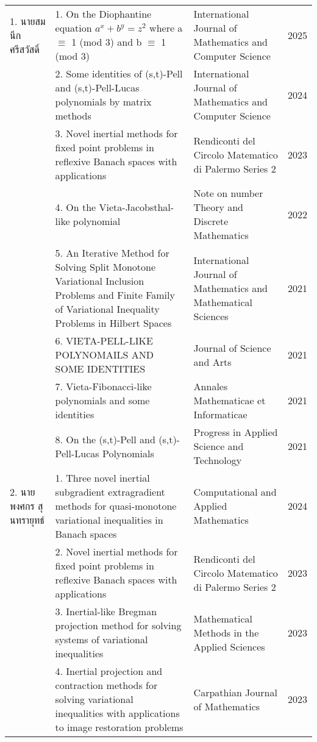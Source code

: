 {{\begin{center}
\begin{longtable}{|p{}|>{\raggedright}p{}|>{\raggedright}p{}|p{}|}
1. นายสมนึก ศรีสวัสดิ์&
1. On the Diophantine equation $a^x +b^y = z^2$
where a $\equiv$ 1 (mod 3) and b $\equiv$ 1 (mod 3) &
International Journal of Mathematics and Computer Science&
2025 
\\ \cline{2-4}
&2. Some identities of (s,t)-Pell and (s,t)-Pell-Lucas polynomials by matrix methods &
International Journal of Mathematics and Computer Science&
2024 
\\ \cline{2-4}
&3. Novel inertial methods for fixed point problems in reflexive Banach spaces with applications &
Rendiconti del Circolo Matematico di Palermo Series 2&
2023 
\\ \cline{2-4}
&4. On the Vieta-Jacobsthal-like polynomial &
Note on number Theory and Discrete Mathematics &
2022 \\ \cline{2-4}

&5. An Iterative Method for Solving Split Monotone   Variational Inclusion Problems and Finite Family of Variational Inequality Problems in Hilbert Spaces&
International Journal of Mathematics and Mathematical Sciences&2021 
\\ \cline{2-4}

&6. VIETA-PELL-LIKE \newline POLYNOMAILS AND \newline SOME IDENTITIES &
Journal of Science and Arts & 2021 
\\ \cline{2-4}

&7. Vieta-Fibonacci-like polynomials and some identities &
Annales Mathematicae et Informaticae &2021 
\\ \cline{2-4}

&8. On the (s,t)-Pell and (s,t)-Pell-Lucas Polynomials&
Progress in Applied Science and Technology&
2021 
\\ \hline

2. นายพงศกร สุนทรายุทธ์&
1. Three novel inertial subgradient extragradient methods for quasi-monotone variational inequalities in Banach spaces &
Computational and \newline Applied Mathematics&
2024 \\ \cline{2-4}

&2. Novel inertial methods \newline for   
fixed point problems in  
reflexive Banach spaces 
with applications &
Rendiconti del Circolo Matematico di Palermo Series 2&
2023
\\ \hline

&3. Inertial-like Bregman\newline 
projection method for 
solving systems of 
variational inequalities
&Mathematical Methods in the Applied Sciences
& 2023 		
 \\ \cline{2-4}
&4. Inertial projection and \newline  
contraction methods for 
solving variational
inequalities with
applications to image   
restoration problems							
&
Carpathian Journal 
of Mathematics&
2023 
\\ \cline{2-4}


\end{longtable}
\end{center}}}
